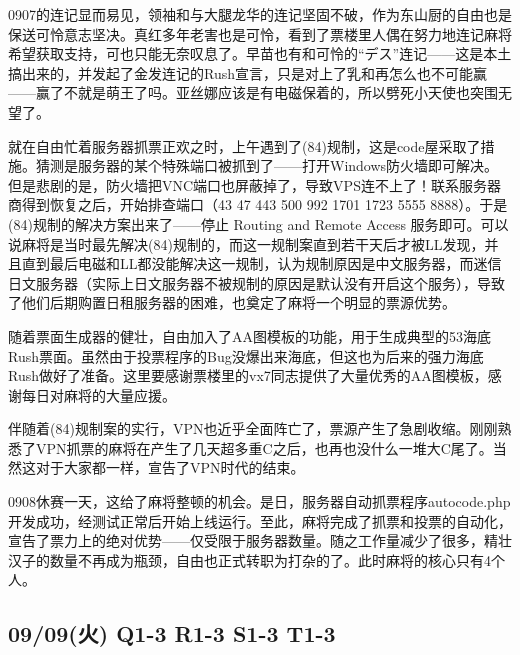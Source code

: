 0907的连记显而易见，领袖和与大腿龙华的连记坚固不破，作为东山厨的自由也是保送可怜意志坚决。真红多年老害也是可怜，看到了票楼里人偶在努力地连记麻将希望获取支持，可也只能无奈叹息了。早苗也有和可怜的“デス”连记——这是本土搞出来的，并发起了金发连记的Rush宣言，只是对上了乳和再怎么也不可能赢——赢了不就是萌王了吗。亚丝娜应该是有电磁保着的，所以劈死小天使也突围无望了。

就在自由忙着服务器抓票正欢之时，上午遇到了(84)规制，这是code屋采取了措施。猜测是服务器的某个特殊端口被抓到了——打开Windows防火墙即可解决。但是悲剧的是，防火墙把VNC端口也屏蔽掉了，导致VPS连不上了！联系服务器商得到恢复之后，开始排查端口（43 47 443 500 992 1701 1723 5555 8888）。于是(84)规制的解决方案出来了——停止 Routing and Remote Access 服务即可。可以说麻将是当时最先解决(84)规制的，而这一规制案直到若干天后才被LL发现，并且直到最后电磁和LL都没能解决这一规制，认为规制原因是中文服务器，而迷信日文服务器（实际上日文服务器不被规制的原因是默认没有开启这个服务），导致了他们后期购置日租服务器的困难，也奠定了麻将一个明显的票源优势。

随着票面生成器的健壮，自由加入了AA图模板的功能，用于生成典型的53海底Rush票面。虽然由于投票程序的Bug没爆出来海底，但这也为后来的强力海底Rush做好了准备。这里要感谢票楼里的vx7同志提供了大量优秀的AA图模板，感谢每日对麻将的大量应援。

伴随着(84)规制案的实行，VPN也近乎全面阵亡了，票源产生了急剧收缩。刚刚熟悉了VPN抓票的麻将在产生了几天超多重C之后，也再也没什么一堆大C尾了。当然这对于大家都一样，宣告了VPN时代的结束。

0908休赛一天，这给了麻将整顿的机会。是日，服务器自动抓票程序autocode.php开发成功，经测试正常后开始上线运行。至此，麻将完成了抓票和投票的自动化，宣告了票力上的绝对优势——仅受限于服务器数量。随之工作量减少了很多，精壮汉子的数量不再成为瓶颈，自由也正式转职为打杂的了。此时麻将的核心只有4个人。

\subsection{09/09(火) Q1-3 R1-3 S1-3 T1-3}

